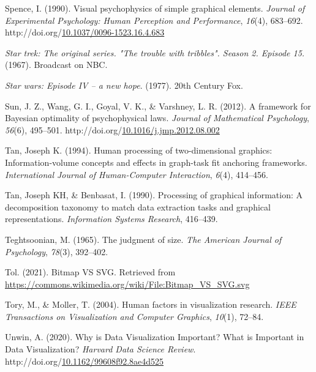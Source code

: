 \documentclass[print]{nuthesis}
\newlength{\cslhangindent}
\newenvironment{CSLReferences}%
{\setlength{\parindent}{0pt}%
\everypar{\setlength{\hangindent}{\cslhangindent}}\ignorespaces}%
{\par}
\begin{document}
\begin{CSLReferences}{1}{0}
\leavevmode{}%
Spence, I. (1990). Visual psychophysics of simple graphical elements. \emph{Journal of Experimental Psychology: Human Perception and Performance}, \emph{16}(4), 683--692. http://doi.org/\href{https://doi.org/10.1037/0096-1523.16.4.683}{10.1037/0096-1523.16.4.683}

\leavevmode{}%
\emph{Star trek: The original series. "The trouble with tribbles". Season 2. Episode 15.} (1967). Broadcast on NBC.

\leavevmode{}%
\emph{Star wars: Episode IV -- a new hope}. (1977). 20th Century Fox.

\leavevmode{}%
Sun, J. Z., Wang, G. I., Goyal, V. K., \& Varshney, L. R. (2012). A framework for {Bayesian} optimality of psychophysical laws. \emph{Journal of Mathematical Psychology}, \emph{56}(6), 495--501. http://doi.org/\href{https://doi.org/10.1016/j.jmp.2012.08.002}{10.1016/j.jmp.2012.08.002}

\leavevmode{}%
Tan, Joseph K. (1994). Human processing of two-dimensional graphics: Information-volume concepts and effects in graph-task fit anchoring frameworks. \emph{International Journal of Human-Computer Interaction}, \emph{6}(4), 414--456.

\leavevmode{}%
Tan, Joseph KH, \& Benbasat, I. (1990). Processing of graphical information: A decomposition taxonomy to match data extraction tasks and graphical representations. \emph{Information Systems Research}, 416--439.

\leavevmode{}%
Teghtsoonian, M. (1965). The judgment of size. \emph{The American Journal of Psychology}, \emph{78}(3), 392--402.

\leavevmode{}%
Tol. (2021). Bitmap VS SVG. Retrieved from \url{https://commons.wikimedia.org/wiki/File:Bitmap_VS_SVG.svg}

\leavevmode{}%
Tory, M., \& Moller, T. (2004). Human factors in visualization research. \emph{IEEE Transactions on Visualization and Computer Graphics}, \emph{10}(1), 72--84.

\leavevmode{}%
Unwin, A. (2020). Why is {Data} {Visualization} {Important}? {What} is {Important} in {Data} {Visualization}? \emph{Harvard Data Science Review}. http://doi.org/\href{https://doi.org/10.1162/99608f92.8ae4d525}{10.1162/99608f92.8ae4d525}


\end{CSLReferences}
\end{document}
